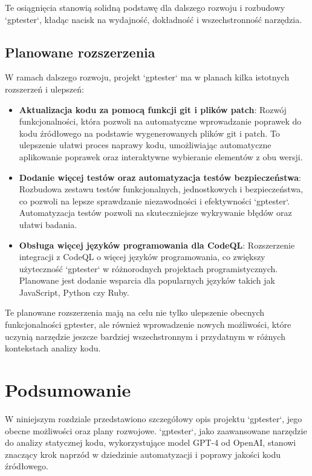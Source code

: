 Te osiągnięcia stanowią solidną podstawę dla dalszego rozwoju i rozbudowy `gptester`, kładąc nacisk na wydajność, dokładność i wszechstronność narzędzia.

\subsection{Planowane rozszerzenia}
\label{subsec:planowane_rozszerzenia}

W ramach dalszego rozwoju, projekt `gptester` ma w planach kilka istotnych rozszerzeń i ulepszeń:

\begin{itemize}
    \item \textbf{Aktualizacja kodu za pomocą funkcji git i plików patch}: Rozwój funkcjonalności, która pozwoli na automatyczne wprowadzanie poprawek do kodu źródłowego na podstawie wygenerowanych plików git i patch. To ulepszenie ułatwi proces naprawy kodu, umożliwiając automatyczne aplikowanie poprawek oraz interaktywne wybieranie elementów z obu wersji.
    \item \textbf{Dodanie więcej testów oraz automatyzacja testów bezpieczeństwa}: Rozbudowa zestawu testów funkcjonalnych, jednostkowych i bezpieczeństwa, co pozwoli na lepsze sprawdzanie niezawodności i efektywności `gptester`. Automatyzacja testów pozwoli na skuteczniejsze wykrywanie błędów oraz ułatwi badania.
    \item \textbf{Obsługa więcej języków programowania dla CodeQL}: Rozszerzenie integracji z CodeQL o więcej języków programowania, co zwiększy użyteczność `gptester` w różnorodnych projektach programistycznych. Planowane jest dodanie wsparcia dla popularnych języków takich jak JavaScript, Python czy Ruby.
\end{itemize}

Te planowane rozszerzenia mają na celu nie tylko ulepszenie obecnych funkcjonalności gptester, ale również wprowadzenie nowych możliwości, które uczynią narzędzie jeszcze bardziej wszechstronnym i przydatnym w różnych kontekstach analizy kodu.
\section{Podsumowanie}
\label{sec:podsumowanie}

W niniejszym rozdziale przedstawiono szczegółowy opis projektu `gptester`, jego obecne możliwości oraz plany rozwojowe. `gptester`, jako zaawansowane narzędzie do analizy statycznej kodu, wykorzystujące model GPT-4 od OpenAI, stanowi znaczący krok naprzód w dziedzinie automatyzacji i poprawy jakości kodu źródłowego.

